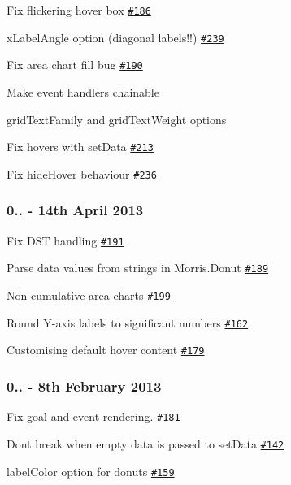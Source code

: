 \begin{DoxyItemize}
\item Fix flickering hover box \href{https://github.com/morrisjs/morris.js/issues/186}{\tt \#186}
\item x\+Label\+Angle option (diagonal labels!!) \href{https://github.com/morrisjs/morris.js/issues/239}{\tt \#239}
\item Fix area chart fill bug \href{https://github.com/morrisjs/morris.js/issues/190}{\tt \#190}
\item Make event handlers chainable
\item grid\+Text\+Family and grid\+Text\+Weight options
\item Fix hovers with set\+Data \href{https://github.com/morrisjs/morris.js/issues/213}{\tt \#213}
\item Fix hide\+Hover behaviour \href{https://github.com/morrisjs/morris.js/issues/236}{\tt \#236}
\end{DoxyItemize}

\subsubsection*{0.. -\/ 14th April 2013}


\begin{DoxyItemize}
\item Fix D\+ST handling \href{https://github.com/morrisjs/morris.js/issues/191}{\tt \#191}
\item Parse data values from strings in Morris.\+Donut \href{https://github.com/morrisjs/morris.js/issues/189}{\tt \#189}
\item Non-\/cumulative area charts \href{https://github.com/morrisjs/morris.js/issues/199}{\tt \#199}
\item Round Y-\/axis labels to significant numbers \href{https://github.com/morrisjs/morris.js/162}{\tt \#162}
\item Customising default hover content \href{https://github.com/morrisjs/morris.js/179}{\tt \#179}
\end{DoxyItemize}

\subsubsection*{0.. -\/ 8th February 2013}


\begin{DoxyItemize}
\item Fix goal and event rendering. \href{https://github.com/morrisjs/morris.js/issues/181}{\tt \#181}
\item Don\textquotesingle{}t break when empty data is passed to set\+Data \href{https://github.com/morrisjs/morris.js/issues/142}{\tt \#142}
\item label\+Color option for donuts \href{https://github.com/morrisjs/morris.js/issues/159}{\tt \#159}
\end{DoxyItemize}

